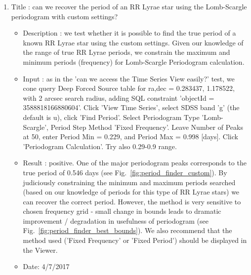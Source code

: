 \documentclass[DM,lsstdraft,toc]{lsstdoc}
\begin{document}
\begin{enumerate}
   \item Title : can we recover the period of an RR Lyrae  star using the Lomb-Scargle periodogram with custom settings?
    \begin{itemize}
      \item Description :  we test whether it is possible to find the true period of a known RR Lyrae star using the custom  settings. Given our knowledge  of the range of true RR Lyrae periods, we constrain the maximum and minimum  periods (frequency) for  Lomb-Scargle Periodogram calculation.
      \item Input : as in the 'can we access the Time Series View easily?' test,  we cone query Deep Forced Source table for ra,dec = 0.283437\degree, 1.178522\degree, with 2 arcsec search radius, adding SQL constraint 'objectId = 3588818166880604'. Click 'View Time Series', select SDSS band 'g' (the default is u), click 'Find Period'. Select Periodogram Type 'Lomb-Scargle', Period Step Method 'Fixed Frequency'. Leave Number of Peaks at 50, enter Period Min = 0.229,  and Period Max = 0.998  [days]. Click 'Periodogram Calculation'. Try also 0.29-0.9  range.
      \item Result : positive. One of the major periodogram peaks corresponds to the true period of 0.546 days (see Fig.~\ref{fig:period_finder_custom}). By judiciously constraining the minimum and maximum periods searched (based on our knowledge of periods for this type of RR Lyrae stars) we can recover the correct period. However, the method is very sensitive to chosen frequency grid - small change in bounds leads to dramatic improvement / degradation in usefulness of periodogram (see Fig.~\ref{fig:period_finder_best_bounds}). We also recommend that the method used ('Fixed Frequency' or 'Fixed Period') should be displayed in the Viewer.
      \item Date: 4/7/2017
    \end{itemize}



\end{enumerate}
\end{document}
